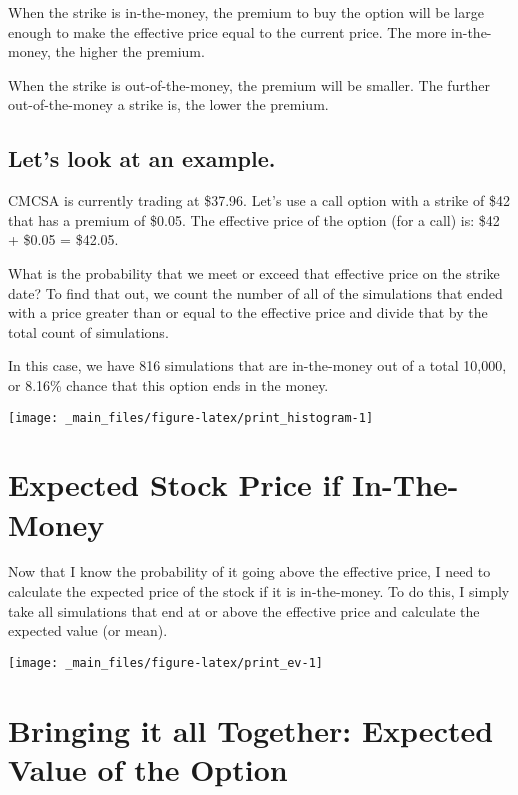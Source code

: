 \documentclass[
]{book}
\begin{document}
When the strike is in-the-money, the premium to buy the option will be large
enough to make the effective price equal to the current price. The more
in-the-money, the higher the premium.

When the strike is out-of-the-money, the premium will be smaller. The further
out-of-the-money a strike is, the lower the premium.

\hypertarget{lets-look-at-an-example.}{%
\subsection{Let's look at an example.}\label{lets-look-at-an-example.}}

CMCSA is currently trading at \$37.96. Let's use a call option
with a strike of \$42 that has a premium of \$0.05. The effective price of the
option (for a call) is: \$42 + \$0.05 = \$42.05.

What is the probability that we meet or exceed that effective price on the
strike date? To find that out, we count the number of all of the simulations
that ended with a price greater than or equal to the effective price and divide
that by the total count of simulations.

In this case, we have 816 simulations that are in-the-money
out of a total 10,000, or
8.16\% chance that this
option ends in the money.

\begin{center}\texttt{[image: \_main\_files/figure-latex/print\_histogram-1]} \end{center}

\hypertarget{expected-stock-price-if-in-the-money}{%
\section{Expected Stock Price if In-The-Money}\label{expected-stock-price-if-in-the-money}}

Now that I know the probability of it going above the effective price, I need to
calculate the expected price of the stock if it is in-the-money. To do this, I
simply take all simulations that end at or above the effective price and
calculate the expected value (or mean).

\begin{center}\texttt{[image: \_main\_files/figure-latex/print\_ev-1]} \end{center}

\hypertarget{bringing-it-all-together-expected-value-of-the-option}{%
\section{Bringing it all Together: Expected Value of the Option}\label{bringing-it-all-together-expected-value-of-the-option}}
\end{document}
